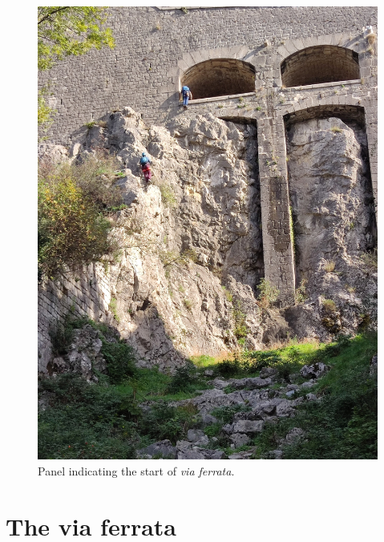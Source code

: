 \begin{figure}[!ht]
	\centering%
	\includegraphics[width=\columnwidth, clip]{media/pictures/via-ferrata-les-prises-de-la-bastille-5}
	\caption{\label{fig:via-ferrata-les-prises-de-la-bastille-5}Panel indicating the start of \emph{via ferrata}.}
\end{figure}

\section*{The via ferrata}

\endinput